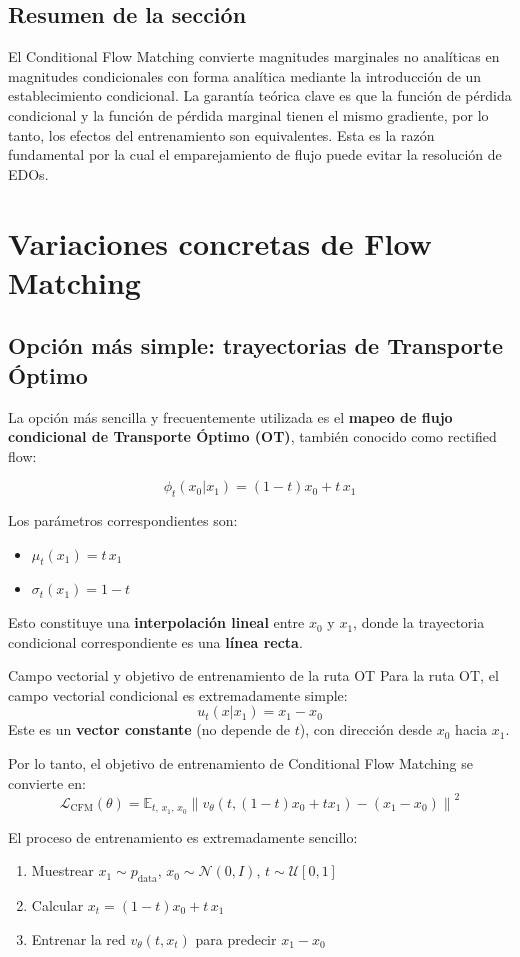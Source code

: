 \documentclass[a4paper]{article}
\begin{document}
\subsection{Resumen de la sección}

El Conditional Flow Matching convierte magnitudes marginales no analíticas en magnitudes condicionales con forma analítica mediante la introducción de un establecimiento condicional. La garantía teórica clave es que la función de pérdida condicional y la función de pérdida marginal tienen el mismo gradiente, por lo tanto, los efectos del entrenamiento son equivalentes. Esta es la razón fundamental por la cual el emparejamiento de flujo puede evitar la resolución de EDOs.
\section{Variaciones concretas de Flow Matching}

\subsection{Opción más simple: trayectorias de Transporte Óptimo}

La opción más sencilla y frecuentemente utilizada es el \textbf{mapeo de flujo condicional de Transporte Óptimo (OT)}, también conocido como rectified flow:

$$\phi_t(x_0 | x_1) = (1 - t) x_0 + t \, x_1$$

Los parámetros correspondientes son:
\begin{itemize}
    \item $\mu_t(x_1) = t \, x_1$
    \item $\sigma_t(x_1) = 1 - t$
\end{itemize}

Esto constituye una \textbf{interpolación lineal} entre $x_0$ y $x_1$, donde la trayectoria condicional correspondiente es una \textbf{línea recta}.

\begin{importantbox}{Campo vectorial y objetivo de entrenamiento de la ruta OT}
Para la ruta OT, el campo vectorial condicional es extremadamente simple:
$$u_t(x | x_1) = x_1 - x_0$$
Este es un \textbf{vector constante} (no depende de $t$), con dirección desde $x_0$ hacia $x_1$.

Por lo tanto, el objetivo de entrenamiento de Conditional Flow Matching se convierte en:
$$\mathcal{L}_{\text{CFM}}(\theta) = \mathbb{E}_{t, \, x_1, \, x_0} \left\| v_\theta(t, (1-t)x_0 + t x_1) - (x_1 - x_0) \right\|^2$$

El proceso de entrenamiento es extremadamente sencillo:
\begin{enumerate}
    \item Muestrear $x_1 \sim p_{\text{data}}$, $x_0 \sim \mathcal{N}(0, I)$, $t \sim \mathcal{U}[0,1]$
    \item Calcular $x_t = (1-t)x_0 + t \, x_1$
    \item Entrenar la red $v_\theta(t, x_t)$ para predecir $x_1 - x_0$
\end{enumerate}
\end{importantbox}
\end{document}
